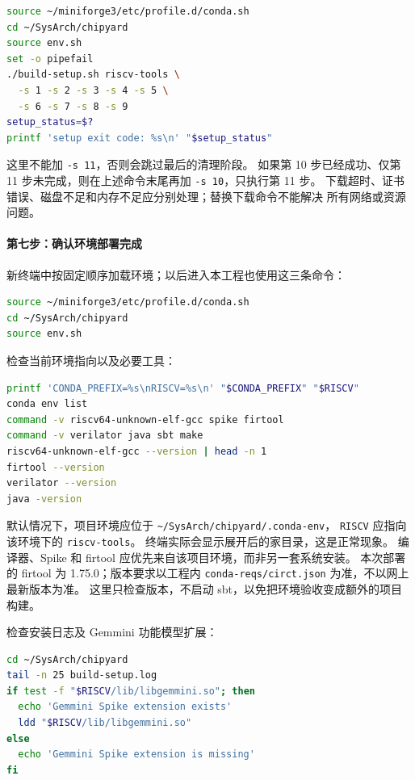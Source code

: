 \begin{lstlisting}[language=bash]
source ~/miniforge3/etc/profile.d/conda.sh
cd ~/SysArch/chipyard
source env.sh
set -o pipefail
./build-setup.sh riscv-tools \
  -s 1 -s 2 -s 3 -s 4 -s 5 \
  -s 6 -s 7 -s 8 -s 9
setup_status=$?
printf 'setup exit code: %s\n' "$setup_status"
\end{lstlisting}

这里不能加 \lstinline|-s 11|，否则会跳过最后的清理阶段。
如果第 10 步已经成功、仅第 11 步未完成，则在上述命令末尾再加
\lstinline|-s 10|，只执行第 11 步。
下载超时、证书错误、磁盘不足和内存不足应分别处理；替换下载命令不能解决
所有网络或资源问题。

\paragraph{第七步：确认环境部署完成}
新终端中按固定顺序加载环境；以后进入本工程也使用这三条命令：

\begin{lstlisting}[language=bash]
source ~/miniforge3/etc/profile.d/conda.sh
cd ~/SysArch/chipyard
source env.sh
\end{lstlisting}

检查当前环境指向以及必要工具：

\begin{lstlisting}[language=bash]
printf 'CONDA_PREFIX=%s\nRISCV=%s\n' "$CONDA_PREFIX" "$RISCV"
conda env list
command -v riscv64-unknown-elf-gcc spike firtool
command -v verilator java sbt make
riscv64-unknown-elf-gcc --version | head -n 1
firtool --version
verilator --version
java -version
\end{lstlisting}

默认情况下，项目环境应位于 \lstinline|~/SysArch/chipyard/.conda-env|，
\lstinline|RISCV| 应指向该环境下的 \lstinline|riscv-tools|。
终端实际会显示展开后的家目录，这是正常现象。
编译器、Spike 和 firtool 应优先来自该项目环境，而非另一套系统安装。
本次部署的 firtool 为 1.75.0；版本要求以工程内
\lstinline|conda-reqs/circt.json| 为准，不以网上最新版本为准。
这里只检查版本，不启动 sbt，以免把环境验收变成额外的项目构建。

检查安装日志及 Gemmini 功能模型扩展：

\begin{lstlisting}[language=bash]
cd ~/SysArch/chipyard
tail -n 25 build-setup.log
if test -f "$RISCV/lib/libgemmini.so"; then
  echo 'Gemmini Spike extension exists'
  ldd "$RISCV/lib/libgemmini.so"
else
  echo 'Gemmini Spike extension is missing'
fi
\end{lstlisting}

